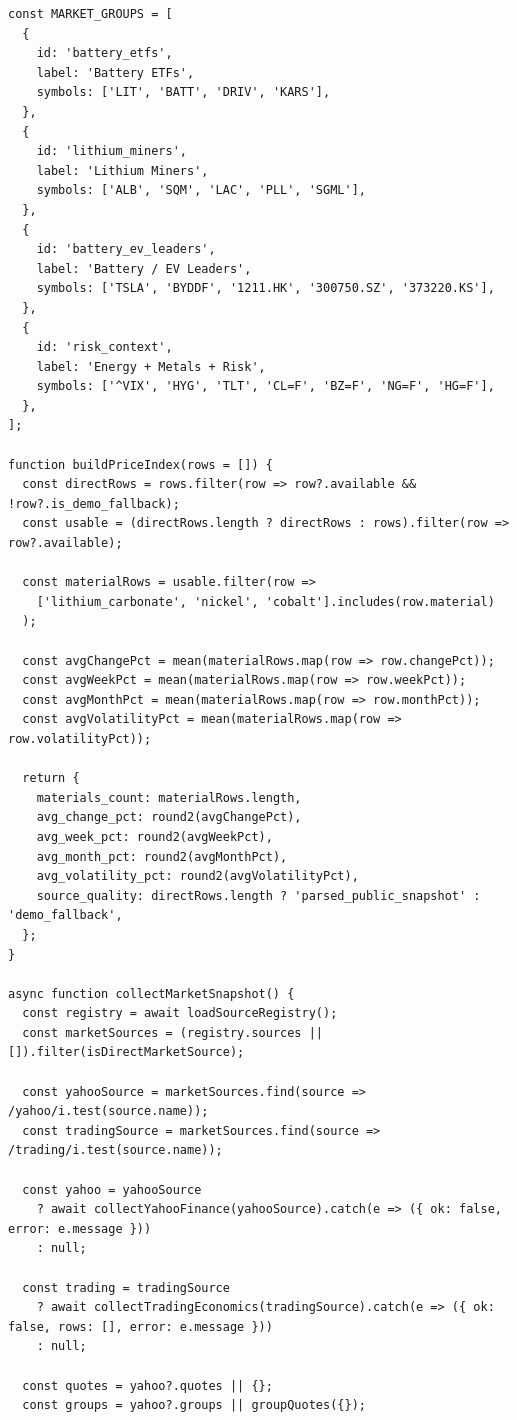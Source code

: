 \documentclass[12pt,a4paper]{article}
\begin{document}
\begin{lstlisting}[style=projectcode,caption={市场价格代理指标与材料价格指数构建}]
const MARKET_GROUPS = [
  {
    id: 'battery_etfs',
    label: 'Battery ETFs',
    symbols: ['LIT', 'BATT', 'DRIV', 'KARS'],
  },
  {
    id: 'lithium_miners',
    label: 'Lithium Miners',
    symbols: ['ALB', 'SQM', 'LAC', 'PLL', 'SGML'],
  },
  {
    id: 'battery_ev_leaders',
    label: 'Battery / EV Leaders',
    symbols: ['TSLA', 'BYDDF', '1211.HK', '300750.SZ', '373220.KS'],
  },
  {
    id: 'risk_context',
    label: 'Energy + Metals + Risk',
    symbols: ['^VIX', 'HYG', 'TLT', 'CL=F', 'BZ=F', 'NG=F', 'HG=F'],
  },
];

function buildPriceIndex(rows = []) {
  const directRows = rows.filter(row => row?.available && !row?.is_demo_fallback);
  const usable = (directRows.length ? directRows : rows).filter(row => row?.available);

  const materialRows = usable.filter(row =>
    ['lithium_carbonate', 'nickel', 'cobalt'].includes(row.material)
  );

  const avgChangePct = mean(materialRows.map(row => row.changePct));
  const avgWeekPct = mean(materialRows.map(row => row.weekPct));
  const avgMonthPct = mean(materialRows.map(row => row.monthPct));
  const avgVolatilityPct = mean(materialRows.map(row => row.volatilityPct));

  return {
    materials_count: materialRows.length,
    avg_change_pct: round2(avgChangePct),
    avg_week_pct: round2(avgWeekPct),
    avg_month_pct: round2(avgMonthPct),
    avg_volatility_pct: round2(avgVolatilityPct),
    source_quality: directRows.length ? 'parsed_public_snapshot' : 'demo_fallback',
  };
}

async function collectMarketSnapshot() {
  const registry = await loadSourceRegistry();
  const marketSources = (registry.sources || []).filter(isDirectMarketSource);

  const yahooSource = marketSources.find(source => /yahoo/i.test(source.name));
  const tradingSource = marketSources.find(source => /trading/i.test(source.name));

  const yahoo = yahooSource
    ? await collectYahooFinance(yahooSource).catch(e => ({ ok: false, error: e.message }))
    : null;

  const trading = tradingSource
    ? await collectTradingEconomics(tradingSource).catch(e => ({ ok: false, rows: [], error: e.message }))
    : null;

  const quotes = yahoo?.quotes || {};
  const groups = yahoo?.groups || groupQuotes({});


\end{lstlisting}
\end{document}
